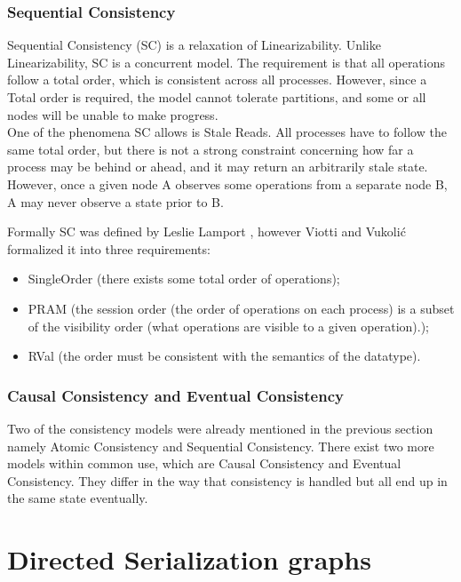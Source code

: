 \documentclass[a4paper,10pt,titlepage]{report}
\begin{document}
\subsubsection{Sequential Consistency}
Sequential Consistency (SC) is a relaxation of Linearizability. Unlike Linearizability, SC is a concurrent model. The requirement is that all operations follow a total order, which is consistent across all processes. However, since a Total order is required, the model cannot tolerate partitions, and some or all nodes will be unable to make progress. 
\\ \vspace{5mm}
One of the phenomena SC allows is Stale Reads. All processes have to follow the same total order, but there is not a strong constraint concerning how far a process may be behind or ahead, and it may return an arbitrarily stale state. However, once a given node A observes some operations from a separate node B, A may never observe a state prior to B.

Formally SC was defined by Leslie Lamport \cite{Lamport1979how}, however Viotti and Vukolić \cite{ConsistencyinNonTransactionalDistributedStorageSystems} formalized it into three requirements:
\begin{itemize}
    \item SingleOrder (there exists some total order of operations);
    \item PRAM (the session order (the order of operations on each process) is a subset of the visibility order (what operations are visible to a given operation).);
    \item RVal (the order must be consistent with the semantics of the datatype).
\end{itemize}

\subsubsection{Causal Consistency and Eventual Consistency}
Two of the consistency models were already mentioned in the previous section namely Atomic Consistency and Sequential Consistency. There exist two more models within common use, which are Causal Consistency and Eventual Consistency. They differ in the way that consistency is handled but all end up in the same state eventually.


\newpage
\section{Directed Serialization graphs}
\end{document}
